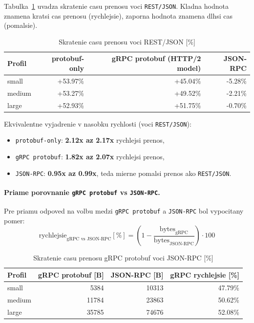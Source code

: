 \documentclass[12pt,a4paper]{report}
\begin{document}
Tabulka~\ref{tab:transfer-faster-vs-rest} uvadza skratenie casu prenosu
voci \texttt{REST/JSON}. Kladna hodnota znamena kratsi cas prenosu
(rychlejsie), zaporna hodnota znamena dlhsi cas (pomalsie).

\begin{table}[htbp]
\centering
\caption{Skratenie casu prenosu voci REST/JSON [\%]}
\label{tab:transfer-faster-vs-rest}
\begin{tabular}{|l|r|r|r|}
\hline
Profil & protobuf-only & gRPC protobuf (HTTP/2 model) & JSON-RPC \\
\hline
small  & +53.97\% & +45.04\% & -5.28\% \\
medium & +53.27\% & +49.52\% & -2.21\% \\
large  & +52.93\% & +51.75\% & -0.70\% \\
\hline
\end{tabular}
\end{table}

Ekvivalentne vyjadrenie v nasobku rychlosti (voci \texttt{REST/JSON}):
\begin{itemize}
  \item \texttt{protobuf-only}: \textbf{2.12x az 2.17x} rychlejsi prenos,
  \item \texttt{gRPC protobuf}: \textbf{1.82x az 2.07x} rychlejsi prenos,
  \item \texttt{JSON-RPC}: \textbf{0.95x az 0.99x}, teda mierne pomalsi
  prenos ako \texttt{REST/JSON}.
\end{itemize}

\paragraph{Priame porovnanie \texttt{gRPC protobuf} vs \texttt{JSON-RPC}.}

Pre priamu odpoved na volbu medzi \texttt{gRPC protobuf} a \texttt{JSON-RPC}
bol vypocitany pomer:
\begin{equation}
\text{rychlejsie}_{\text{gRPC vs JSON-RPC}}[\%] =
\left(1-\frac{\text{bytes}_{\text{gRPC}}}{\text{bytes}_{\text{JSON-RPC}}}\right)\cdot100
\end{equation}

\begin{table}[htbp]
\centering
\caption{Skratenie casu prenosu gRPC protobuf voci JSON-RPC [\%]}
\label{tab:grpc-vs-jsonrpc}
\begin{tabular}{|l|r|r|r|}
\hline
Profil & gRPC protobuf [B] & JSON-RPC [B] & gRPC rychlejsie [\%] \\
\hline
small  & 5384  & 10313 & 47.79\% \\
medium & 11784 & 23863 & 50.62\% \\
large  & 35785 & 74676 & 52.08\% \\
\hline
\end{tabular}
\end{table}
\end{document}
